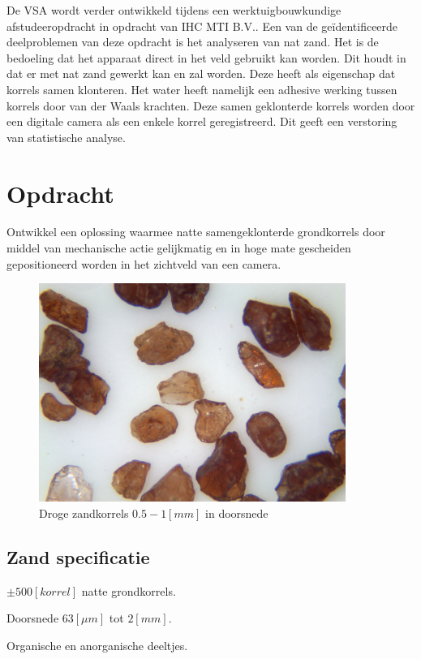 \documentclass[a4paper,11pt]{../LatexDocStructures/MTItexMemo} %
\begin{document}
De VSA wordt verder ontwikkeld tijdens een werktuigbouwkundige afstudeeropdracht in opdracht van IHC MTI B.V.. Een van de geïdentificeerde deelproblemen van deze opdracht is het analyseren van nat zand. Het is de bedoeling dat het apparaat direct in het veld gebruikt kan worden. Dit houdt in dat er met nat zand gewerkt kan en zal worden. Deze heeft als eigenschap dat korrels samen klonteren. Het water heeft namelijk een adhesive werking tussen korrels door van der Waals krachten. Deze samen geklonterde korrels worden door een digitale camera als een enkele korrel geregistreerd. Dit geeft een verstoring van statistische analyse. 

\section{Opdracht}
\noindent Ontwikkel een oplossing waarmee natte samengeklonterde grondkorrels door middel van mechanische actie gelijkmatig en in hoge mate gescheiden gepositioneerd worden in het zichtveld van een camera.
\begin{figure}[h]
	\centering
	\includegraphics[width=10cm]{../Pictures/gannet2040.png}
	\caption{Droge zandkorrels $ 0.5 - 1 [mm] $ in doorsnede}
\end{figure}

\subsection{Zand specificatie}
\begin{description}
	\setlength{\itemsep}{0cm}
	\setlength{\parskip}{0cm}
	\item[\textbf{Aantal}] $ \pm 500 [korrel] $ natte grondkorrels.
	\item[\textbf{Dimensies}] Doorsnede $ 63[\mu m] $ tot $ 2 [mm] $.
	\item[\textbf{Materiaal}] Organische en anorganische deeltjes.
\end{description}
\end{document}
